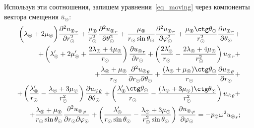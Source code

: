 Используя эти соотношения, запишем уравнения~\eqref{eq_moving} через компоненты вектора смещения $\bar{u}_\circledcirc$:
\begin{equation*}
\begin{split}
\biggl(\lambda_\circledcirc+2\mu_\circledcirc\biggr)\frac{\partial^2 {u_\circledcirc}_r}{\partial r_\odot^2} + \frac{\mu_\circledcirc}{r_\odot^2}\frac{\partial^2 {u_\circledcirc}_r}{\partial\theta_\odot^2} +\frac{\mu_\circledcirc}{r_\odot\sin\theta_\odot}\frac{\partial^2 {u_\circledcirc}_r}{\partial\varphi_\odot^2} + \frac{\mu_\circledcirc\ctg\theta_\odot}{r_\odot^2}\frac{\partial {u_\circledcirc}_r}{\partial \theta_\odot} + \\
+ \left(\lambda_\circledcirc'+2\mu_\circledcirc'+\frac{2\lambda_\circledcirc+4\mu_\circledcirc}{r_\odot}\right)\frac{\partial{u_\circledcirc}_r}{\partial r_\odot} + \left(\frac{2\lambda_\circledcirc'}{r_\odot} - \frac{2\lambda_\circledcirc+4\mu_\circledcirc}{r_\odot^2}\right){u_\circledcirc}_r + \\
+ \frac{\lambda_\circledcirc+\mu_\circledcirc}{r_\odot}\frac{\partial^2 {u_\circledcirc}_\theta}{\partial r_\odot\partial\theta_\odot} + \frac{(\lambda_\circledcirc+\mu_\circledcirc)\ctg\theta_\odot}{r_\odot}\frac{\partial {u_\circledcirc}_\theta}{\partial r_\odot} + \\ 
+ \left(\frac{\lambda_\circledcirc'}{r_\odot} - \frac{\lambda_\circledcirc+3\mu_\circledcirc}{r_\odot^2}\right)\frac{\partial {u_\circledcirc}_\theta}{\partial \theta_\odot} +\left(\frac{\lambda_\circledcirc'\ctg\theta_\odot}{r_\odot} - \frac{(\lambda_\circledcirc+3\mu_\circledcirc)\ctg\theta_\odot}{r_\odot^2}\right){u_\circledcirc}_\theta + \\
+\frac{\lambda_\circledcirc+\mu_\circledcirc}{r_\odot\sin\theta_\odot}\frac{\partial^2 {u_\circledcirc}_\varphi}{\partial r_\odot\partial\varphi_\odot}
+ \left(\frac{\lambda_\circledcirc'}{r_\odot\sin\theta_\odot} - \frac{\lambda_\odot+3\mu_\odot}{r_\odot^2\sin\theta_\odot}\right)\frac{\partial {u_\circledcirc}_\varphi}{\partial \varphi_\odot} = -p_\circledcirc\omega^2{u_\circledcirc}_r;
\end{split}
\end{equation*}

